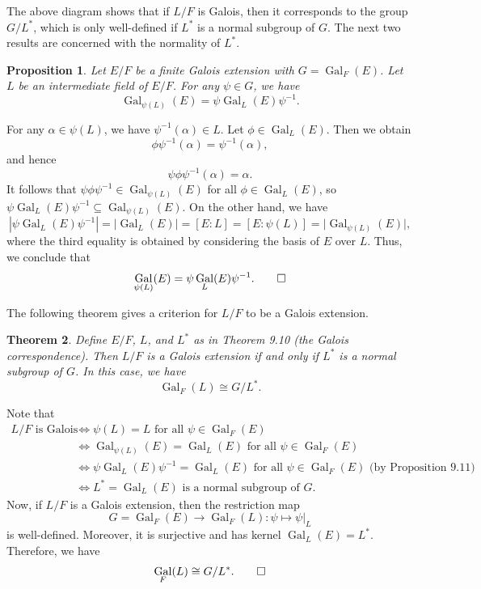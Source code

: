 \documentclass[10pt]{article}
\makeatletter
\DeclareMathOperator{\Gal}{Gal}
\theoremstyle{newstyle}
\newtheorem{thm}{Theorem}[section]
\newtheorem{prop}[thm]{Proposition}
\newenvironment{pf}[1][\proofname]{\par
  \pushQED{\qed}%
  \normalfont \topsep0\p@\relax
  \trivlist
  \item[\hskip\labelsep\scshape
  #1\@addpunct{.}]\ignorespaces
}{%
  \popQED\endtrivlist\@endpefalse
}
\makeatother
\begin{document}
The above diagram shows that if $L/F$ is Galois, then it corresponds to the group 
$G/L^*$, which is only well-defined if $L^*$ is a normal subgroup of $G$. The next 
two results are concerned with the normality of $L^*$. 

\begin{prop}
Let $E/F$ be a finite Galois extension with $G = \Gal_F(E)$. Let $L$ be an intermediate 
field of $E/F$. For any $\psi \in G$, we have 
\[ \Gal_{\psi(L)}(E) = \psi \Gal_L(E) \psi^{-1}. \]
\end{prop}
\begin{pf}
For any $\alpha \in \psi(L)$, we have $\psi^{-1}(\alpha) \in L$. Let $\phi \in \Gal_L(E)$. 
Then we obtain 
\[ \phi\psi^{-1}(\alpha) = \psi^{-1}(\alpha), \]
and hence 
\[ \psi\phi\psi^{-1}(\alpha) = \alpha. \]
It follows that $\psi\phi\psi^{-1} \in \Gal_{\psi(L)}(E)$ for all $\phi \in \Gal_L(E)$, 
so $\psi\Gal_L(E)\psi^{-1} \subseteq \Gal_{\psi(L)}(E)$. On the other hand, we have 
\[ |\psi\Gal_L(E)\psi^{-1}| = \lvert \Gal_L(E) \rvert 
= [E : L] = [E : \psi(L)] = \lvert \Gal_{\psi(L)}(E)|, \]
where the third equality is obtained by considering the basis of $E$ over $L$. Thus, we conclude that 
\[ \Gal_{\psi(L)}(E) = \psi \Gal_L(E) \psi^{-1}. \qedhere \]
\end{pf}

The following theorem gives a criterion for $L/F$ to be a Galois extension. 

\begin{thm}
Define $E/F$, $L$, and $L^*$ as in Theorem 9.10 (the Galois correspondence). Then 
$L/F$ is a Galois extension if and only if $L^*$ is a normal subgroup of $G$. 
In this case, we have 
\[ \Gal_F(L) \cong G/L^*. \]
\end{thm}
\begin{pf}
Note that 
\begin{align*}
    L/F \text{ is Galois} &\iff 
    \psi(L) = L \text{ for all } \psi \in \Gal_F(E) \\
    &\iff \Gal_{\psi(L)}(E) = \Gal_L(E) \text{ for all } \psi \in \Gal_F(E) \\
    &\iff \psi \Gal_L(E) \psi^{-1} = \Gal_L(E) \text{ for all } \psi \in \Gal_F(E) \text { (by Proposition 9.11)} \\
    &\iff L^* = \Gal_L(E) \text{ is a normal subgroup of $G$.}
\end{align*}
Now, if $L/F$ is a Galois extension, then the restriction map 
\[ G = \Gal_F(E) \to \Gal_F(L) : \psi \mapsto \psi|_L \]
is well-defined. Moreover, it is surjective and has kernel $\Gal_L(E) = L^*$. 
Therefore, we have 
\[ \Gal_F(L) \cong G/L^*. \qedhere \]
\end{pf}
\end{document}
